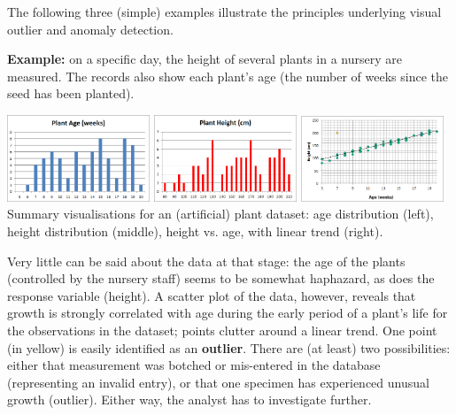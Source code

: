 \documentclass[20pt,landscape,footrule,headrule]{foils}
\def\fh{\foilhead}
\begin{document}
\fh{Visual Outlier Detection} The following three (simple) examples illustrate the principles underlying visual outlier and anomaly detection. 


\textbf{Example:} on a specific day, the height of several plants in a nursery are measured. The records also show each plant's age (the number of weeks since the seed has been planted). 


\begin{center}
\includegraphics[width=0.32\textwidth]{Images/plant_age_EN}\quad
\includegraphics[width=0.32\textwidth]{Images/plant_height_EN}\quad
\includegraphics[width=0.32\textwidth]{Images/plant_height_vs_age_EN} \\  Summary visualisations for an (artificial) plant dataset: age distribution (left), height distribution (middle), height vs. age, with linear trend (right).\end{center} 

Very little can be said about the data at that stage: the age of the plants (controlled by the nursery staff) seems to be somewhat haphazard, as does the response variable (height). A scatter plot of the data, however, reveals that growth is strongly correlated with age during the early period of a plant's life for the observations in the dataset; points clutter around a linear trend. One point (in yellow) is easily identified as an \textbf{outlier}. There are (at least) two possibilities: either that measurement was botched or mis-entered in the database (representing an invalid entry), or that one specimen has experienced unusual growth (outlier). Either way, the analyst has to investigate further.
\end{document}

